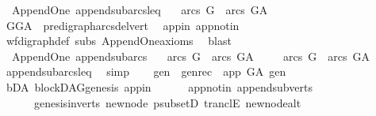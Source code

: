 \begin{isabellebody}
%
\isadelimproof
\isanewline
%
\endisadelimproof
\isanewline
{}\isamarkupfalse%
\ {\isacharparenleft}{\kern0pt}\ Append{\isacharunderscore}{\kern0pt}One{\isacharparenright}{\kern0pt}\ append{\isacharunderscore}{\kern0pt}subarcs{\isacharunderscore}{\kern0pt}leq{\isacharcolon}{\kern0pt}\ \isanewline
\ \ {\isachardoublequoteopen}arcs\ G\ {\isasymsubseteq}\ arcs\ G{\isacharunderscore}{\kern0pt}A{\isachardoublequoteclose}\isanewline
%
\isadelimproof
\ \ %
\endisadelimproof
%
\isatagproof
{}\isamarkupfalse%
\ GG{\isacharunderscore}{\kern0pt}A\ \ pre{\isacharunderscore}{\kern0pt}digraph{\isachardot}{\kern0pt}arcs{\isacharunderscore}{\kern0pt}del{\isacharunderscore}{\kern0pt}vert\ \isamarkupfalse%
\ app{\isacharunderscore}{\kern0pt}in\ app{\isacharunderscore}{\kern0pt}notin\ \isanewline
\ \ \isamarkupfalse%
\ wf{\isacharunderscore}{\kern0pt}digraph{\isacharunderscore}{\kern0pt}def\ subs\ Append{\isacharunderscore}{\kern0pt}One{\isacharunderscore}{\kern0pt}axioms\ \isamarkupfalse%
\ blast%
\endisatagproof
{\isafoldproof}%
%
\isadelimproof
\isanewline
%
\endisadelimproof
\ \ \isanewline
{}\isamarkupfalse%
\ {\isacharparenleft}{\kern0pt}\ Append{\isacharunderscore}{\kern0pt}One{\isacharparenright}{\kern0pt}\ append{\isacharunderscore}{\kern0pt}subarcs{\isacharcolon}{\kern0pt}\ \isanewline
\ \ {\isachardoublequoteopen}arcs\ G\ {\isasymsubset}\ arcs\ G{\isacharunderscore}{\kern0pt}A{\isachardoublequoteclose}\isanewline
%
\isadelimproof
%
\endisadelimproof
%
\isatagproof
{}\isamarkupfalse%
\isanewline
\ \ \isamarkupfalse%
\ \ {\isachardoublequoteopen}arcs\ G\ {\isasymsubseteq}\ arcs\ G{\isacharunderscore}{\kern0pt}A{\isachardoublequoteclose}\ \isamarkupfalse%
\ append{\isacharunderscore}{\kern0pt}subarcs{\isacharunderscore}{\kern0pt}leq\ \isamarkupfalse%
\ simp\isanewline
\ \ \isamarkupfalse%
\ gen\ \ gen{\isacharunderscore}{\kern0pt}rec{\isacharcolon}{\kern0pt}\ {\isachardoublequoteopen}\ app\ {\isasymrightarrow}\isactrlsup {\isacharplus}{\kern0pt}\isactrlbsub G{\isacharunderscore}{\kern0pt}A\isactrlesub \ gen{\isachardoublequoteclose}\ \isamarkupfalse%
\ bD{\isacharunderscore}{\kern0pt}A\ blockDAG{\isachardot}{\kern0pt}genesis\ app{\isacharunderscore}{\kern0pt}in\isanewline
\ \ \ \ \ \ app{\isacharunderscore}{\kern0pt}notin\ append{\isacharunderscore}{\kern0pt}subverts\isanewline
\ \ \ \ \ \ genesis{\isacharunderscore}{\kern0pt}in{\isacharunderscore}{\kern0pt}verts\ new{\isacharunderscore}{\kern0pt}node\ psubsetD\ tranclE\ new{\isacharunderscore}{\kern0pt}node{\isacharunderscore}{\kern0pt}alt\isanewline

\end{isabellebody}
